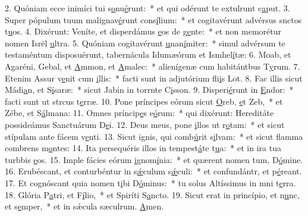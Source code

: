 2. Quóniam ecce inimíci tui s\uline{o}nu\uline{é}runt:~* et qui odérunt te extulrunt c\uline{a}put.
3. Super pópulum tuum malignav\uline{é}runt cons\uline{í}lium:~* et cogitavérunt advérsus snctos t\uline{u}os.
4. Dixérunt: Veníte, et disperdámus \uline{e}os de g\uline{e}nte:~* et non memorétur nomen Isrël \uline{u}ltra.
5. Quóniam cogitavérunt \uline{u}nan\uline{í}miter:~* simul advérsum te testaméntum disposuérunt, tabernácula Idumæórum et Ismhel\uline{í}tæ:
6. Moab, et Agaréni, Gebal, et \uline{A}mmon, et \uline{A}malec:~* alienígenæ cum habitántbus T\uline{y}rum.
7. Etenim Assur v\uline{e}nit cum \uline{i}llis:~* facti sunt in adjutórium fli\uline{i}s Lot.
8. Fac illis sicut Mádi\uline{a}n, et S\uline{í}saræ:~* sicut Jabin in torrnte C\uline{i}sson.
9. Disperi\uline{é}runt in \uline{E}ndor:~* facti sunt ut strcus t\uline{e}rræ.
10. Pone príncipes eórum sicut \uline{O}reb, \uline{e}t Zeb,~* et Zébe, et S\uline{á}lmana:
11. Omnes príncip\uline{e}s e\uline{ó}rum:~* qui dixérunt: Hereditáte possideámus Sanctuárum D\uline{e}i.
12. Deus meus, pone \uline{i}llos ut r\uline{o}tam:~* et sicut stípulam ante fácem v\uline{e}nti.
13. Sicut ignis, qui comb\uline{ú}rit s\uline{i}lvam:~* et sicut flamma combrens m\uline{o}ntes:
14. Ita persequéris illos in tempest\uline{á}te t\uline{u}a:~* et in ira tua turbbis \uline{e}os.
15. Imple fácies eórum \uline{i}gnom\uline{í}nia:~* et quærent nomen tum, D\uline{ó}mine.
16. Erubéscant, et conturbéntur in s\uline{ǽ}culum s\uline{ǽ}culi:~* et confundántr, et p\uline{é}reant.
17. Et cognóscant quia nomen t\uline{i}bi D\uline{ó}minus:~* tu solus Altíssimus in mni t\uline{e}rra.
18. Glória P\uline{a}tri, et F\uline{í}lio,~* et Spiríti S\uline{a}ncto.
19. Sicut erat in princípio, et n\uline{u}nc, et s\uline{e}mper,~* et in sǽcula sæculrum. \uline{A}men.

